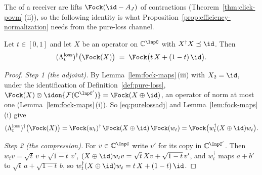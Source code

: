 
The  of a receiver are lifts $\Fock(\id-A_J)$ of
contractions (Theorem~\ref{thm:click-povm}\,(ii)), so the following identity
is what Proposition~\ref{prop:efficiency-normalization} needs from the
pure-loss channel.

\begin{lemma}\label{lem:pure-loss-lift}
Let $t\in[0,1]$ and let $X$ be an operator on $\mathbb{C}^{\InpC}$ with
$X^{\dagger}X\preceq\id$. Then
\begin{equation}\label{eq:purelosslift}
  (\Lambda^{\mathrm{loss}}_t)^{\dagger}\big(\Fock(X)\big)
  \;=\;\Fock\big(t\,X+(1-t)\,\id\big).
\end{equation}
\end{lemma}

\begin{proof}
\emph{Step 1 (the adjoint).} By Lemma~\ref{lem:fock-maps}\,(iii) with
$X_2=\id$, under the identification of Definition~\ref{def:pure-loss},
$\Fock(X)\otimes\idon{\mathcal{F}(\mathbb{C}^{\InpC'})}=\Fock(X\oplus\id)$,
an operator of norm at most one (Lemma~\ref{lem:fock-maps}\,(i)). So
\eqref{eq:purelossadj} and Lemma~\ref{lem:fock-maps}\,(i) give
\begin{equation*}
  (\Lambda^{\mathrm{loss}}_t)^{\dagger}\big(\Fock(X)\big)
  =\Fock(w_t)^{\dagger}\,\Fock(X\oplus\id)\,\Fock(w_t)
  =\Fock\big(w_t^{\dagger}(X\oplus\id)w_t\big).
\end{equation*}

\emph{Step 2 (the compression).} For $v\in\mathbb{C}^{\InpC}$ write $v'$ for
its copy in $\mathbb{C}^{\InpC'}$. Then $w_tv=\sqrt t\,v+\sqrt{1-t}\,v'$,
$(X\oplus\id)w_tv=\sqrt t\,Xv+\sqrt{1-t}\,v'$, and $w_t^{\dagger}$ maps
$a+b'$ to $\sqrt t\,a+\sqrt{1-t}\,b$, so
$w_t^{\dagger}(X\oplus\id)w_t=t\,X+(1-t)\,\id$.
\end{proof}

